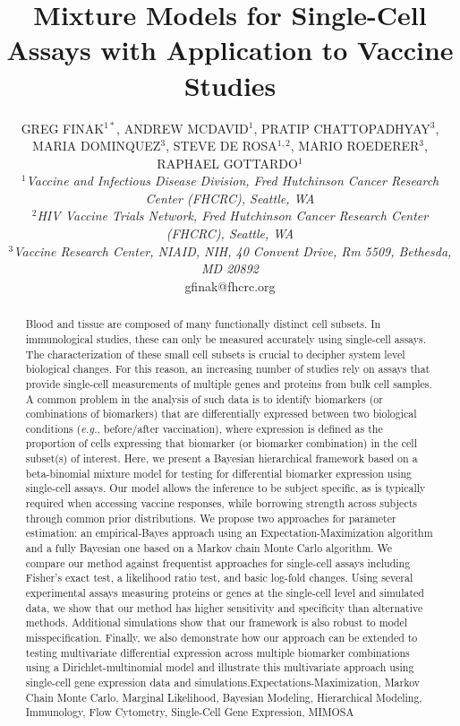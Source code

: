 \documentclass[12pt,oupdraft]{biostatistics}
\title{Mixture Models for Single-Cell Assays with Application to Vaccine Studies}
\author{GREG FINAK$^{1\ast}$, 
 ANDREW MCDAVID$^{1}$,
 PRATIP CHATTOPADHYAY$^{3}$,
 MARIA DOMINQUEZ$^{3}$,
 STEVE DE ROSA$^{1,2}$,
 MARIO ROEDERER$^{3}$,\\
 RAPHAEL GOTTARDO$^{1}$
 \\[4pt]
\textit{ $^{1}$Vaccine and Infectious Disease Division, Fred Hutchinson Cancer Research Center (FHCRC), Seattle, WA\\
 $^{2}$HIV Vaccine Trials Network, Fred Hutchinson Cancer Research Center (FHCRC), Seattle, WA\\
 $^{3}$Vaccine Research Center, NIAID, NIH, 40 Convent Drive, Rm 5509, Bethesda, MD 20892}
 \\[2pt]
 {gfinak@fhcrc.org}}
\date{}
\begin{document}




\maketitle
{}

\begin{abstract}
{Blood and tissue are composed of many functionally distinct cell subsets. In immunological studies, these can only be measured accurately using single-cell assays. The characterization of these small cell subsets is crucial to decipher system level biological changes. For this reason, an increasing number of studies rely on assays that provide single-cell measurements of multiple genes and proteins from bulk cell samples. A common problem in the analysis of such data is to identify biomarkers (or combinations of biomarkers) that are differentially expressed between two biological conditions (\textit{e.g.}, before/after vaccination), where expression is defined as the proportion of cells expressing that biomarker (or biomarker combination) in the cell subset(s) of interest.
Here, we present a Bayesian hierarchical framework based on a beta-binomial mixture model for testing for differential biomarker expression using single-cell assays. Our model allows the inference to be subject specific, as is typically required when accessing vaccine responses, while borrowing strength across subjects through common prior distributions. We propose two approaches for parameter estimation: an empirical-Bayes approach using an Expectation-Maximization algorithm and a fully Bayesian one based on a Markov chain Monte Carlo algorithm. We compare our method against frequentist approaches for single-cell assays including Fisher's exact test, a likelihood ratio test, and basic log-fold changes. Using several experimental assays measuring proteins or genes at the single-cell level and simulated data, we show that our method has higher sensitivity and specificity than alternative methods. Additional simulations show that our framework is also robust to model misspecification. Finally, we also demonstrate how our approach can be extended to testing multivariate differential expression across multiple biomarker combinations using a Dirichlet-multinomial model and illustrate this multivariate approach using single-cell gene expression data and simulations.}{Expectations-Maximization, Markov Chain Monte Carlo,
Marginal Likelihood, Bayesian Modeling, Hierarchical Modeling,
Immunology, Flow Cytometry, Single-Cell Gene Expression, MIMOSA}
\end{abstract}
\end{document}
